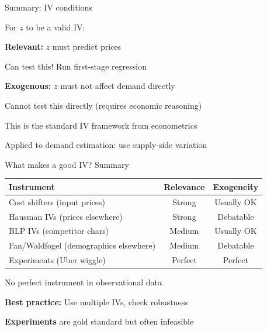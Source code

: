 \documentclass[notes,11pt, aspectratio=169]{beamer}
\newenvironment{wideitemize}{\itemize\addtolength{\itemsep}{10pt}}{\enditemize}
\newenvironment{wideenumerate}{\enumerate\addtolength{\itemsep}{10pt}}{\endenumerate}
\begin{document}
\begin{frame}{Summary: IV conditions}
	\begin{wideitemize}
		\item For $z$ to be a valid IV:
		\begin{wideenumerate}
			\vspace{5pt}
			\item \textbf{Relevant:} $z$ must predict prices
			\begin{wideitemize}
				\item Can test this! Run first-stage regression
			\end{wideitemize}
			\item \textbf{Exogenous:} $z$ must not affect demand directly
			\begin{wideitemize}
				\item Cannot test this directly (requires economic reasoning)
			\end{wideitemize}
		\end{wideenumerate}
		\item This is the standard IV framework from econometrics
		\item Applied to demand estimation: use supply-side variation
	\end{wideitemize}
\end{frame}

\begin{frame}{What makes a good IV? Summary}
	\begin{center}
	\begin{tabular}{lcc}
		\toprule
		\textbf{Instrument} & \textbf{Relevance} & \textbf{Exogeneity} \\
		\midrule
		Cost shifters (input prices) & Strong & Usually OK \\
		Hausman IVs (prices elsewhere) & Strong & Debatable \\
		BLP IVs (competitor chars) & Medium & Usually OK \\
		Fan/Waldfogel (demographics elsewhere) & Medium & Debatable \\
		Experiments (Uber wiggle) & Perfect & Perfect \\
		\bottomrule
	\end{tabular}
	\end{center}
	\vspace{10pt}
	\begin{wideitemize}
		\item No perfect instrument in observational data
		\item \textbf{Best practice:} Use multiple IVs, check robustness
		\item \textbf{Experiments} are gold standard but often infeasible
	\end{wideitemize}
\end{frame}
\end{document}
